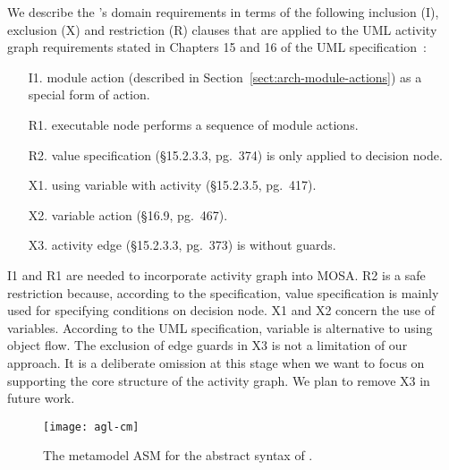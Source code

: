 We describe the \agl's domain requirements in terms of the following inclusion (I), exclusion (X) and restriction (R) clauses that are applied to the UML activity graph requirements stated in Chapters 15 and 16 of the UML specification~\cite{omg_unified_2015}:

\begin{itemize}%
	\item[I1.] module action (described in Section~\ref{sect:arch-module-actions}) as a special form of action.
	\item[R1.] executable node performs a sequence of module actions.
	\item[R2.] value specification (\S{15.2.3.3}, pg.~374) is only applied to decision node.
	\item[X1.] using variable with activity (\S{15.2.3.5}, pg.~417).
	\item[X2.] variable action (\S{16.9}, pg.~467).
  \item[X3.] activity edge (\S{15.2.3.3}, pg.~373) is without guards.
\end{itemize}

I1 and R1 are needed to incorporate activity graph into MOSA. R2 is a safe restriction because, according to the specification, value specification is mainly used for specifying conditions on decision node. X1 and X2 concern the use of variables. According to the UML specification, variable is alternative to using object flow. The exclusion of edge guards in X3 is not a limitation of our approach. It is a deliberate omission at this stage when we want to focus on supporting the core structure of the activity graph. We plan to remove X3 in future work.
%
%
\begin{figure*}[ht]
	\begin{center}
		\texttt{[image: agl-cm]}
	\end{center}
	\caption{The metamodel ASM for the abstract syntax of \agl.} %
	\label{fig:agl-abstractSyntax}
\end{figure*}

